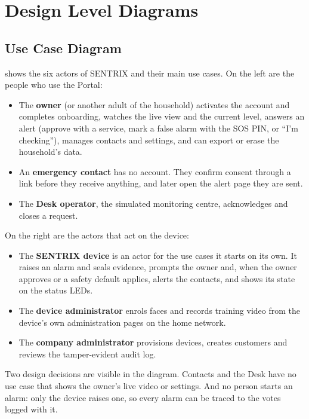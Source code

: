 \section{Design Level Diagrams}
\label{sec:diagrams}

\subsection{Use Case Diagram}
 shows the six actors of SENTRIX and their main use cases. On the left are the people who use the Portal:
\begin{itemize}
\item The \textbf{owner} (or another adult of the household) activates the account and completes onboarding, watches the live view and the current level, answers an alert (approve with a service, mark a false alarm with the SOS PIN, or ``I'm checking''), manages contacts and settings, and can export or erase the household's data.
\item An \textbf{emergency contact} has no account. They confirm consent through a link before they receive anything, and later open the alert page they are sent.
\item The \textbf{Desk operator}, the simulated monitoring centre, acknowledges and closes a request.
\end{itemize}
On the right are the actors that act on the device:
\begin{itemize}
\item The \textbf{SENTRIX device} is an actor for the use cases it starts on its own. It raises an alarm and seals evidence, prompts the owner and, when the owner approves or a safety default applies, alerts the contacts, and shows its state on the status LEDs.
\item The \textbf{device administrator} enrols faces and records training video from the device's own administration pages on the home network.
\item The \textbf{company administrator} provisions devices, creates customers and reviews the tamper-evident audit log.
\end{itemize}
Two design decisions are visible in the diagram. Contacts and the Desk have no use case that shows the owner's live video or settings. And no person starts an alarm: only the device raises one, so every alarm can be traced to the votes logged with it.

